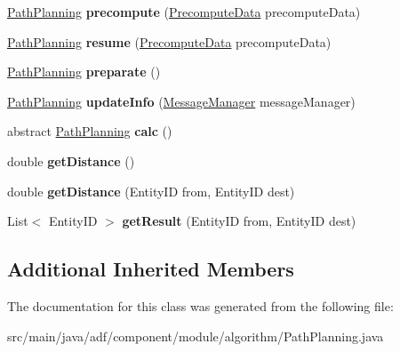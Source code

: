 \begin{DoxyCompactItemize}
\hyperlink{classadf_1_1component_1_1module_1_1algorithm_1_1PathPlanning}{Path\+Planning} {\bfseries precompute} (\hyperlink{classadf_1_1agent_1_1precompute_1_1PrecomputeData}{Precompute\+Data} precompute\+Data)
\item 
\hypertarget{classadf_1_1component_1_1module_1_1algorithm_1_1PathPlanning_a0102328d97aa36805913402296f4db8a}{}\label{classadf_1_1component_1_1module_1_1algorithm_1_1PathPlanning_a0102328d97aa36805913402296f4db8a} 
\hyperlink{classadf_1_1component_1_1module_1_1algorithm_1_1PathPlanning}{Path\+Planning} {\bfseries resume} (\hyperlink{classadf_1_1agent_1_1precompute_1_1PrecomputeData}{Precompute\+Data} precompute\+Data)
\item 
\hypertarget{classadf_1_1component_1_1module_1_1algorithm_1_1PathPlanning_a743d695590022ce81f825d7d08c9f0ea}{}\label{classadf_1_1component_1_1module_1_1algorithm_1_1PathPlanning_a743d695590022ce81f825d7d08c9f0ea} 
\hyperlink{classadf_1_1component_1_1module_1_1algorithm_1_1PathPlanning}{Path\+Planning} {\bfseries preparate} ()
\item 
\hypertarget{classadf_1_1component_1_1module_1_1algorithm_1_1PathPlanning_ac655c99277aa2079c3afe3db65b03042}{}\label{classadf_1_1component_1_1module_1_1algorithm_1_1PathPlanning_ac655c99277aa2079c3afe3db65b03042} 
\hyperlink{classadf_1_1component_1_1module_1_1algorithm_1_1PathPlanning}{Path\+Planning} {\bfseries update\+Info} (\hyperlink{classadf_1_1agent_1_1communication_1_1MessageManager}{Message\+Manager} message\+Manager)
\item 
\hypertarget{classadf_1_1component_1_1module_1_1algorithm_1_1PathPlanning_ae3ab0f57c70ca6d4517a8941bbcba3b4}{}\label{classadf_1_1component_1_1module_1_1algorithm_1_1PathPlanning_ae3ab0f57c70ca6d4517a8941bbcba3b4} 
abstract \hyperlink{classadf_1_1component_1_1module_1_1algorithm_1_1PathPlanning}{Path\+Planning} {\bfseries calc} ()
\item 
\hypertarget{classadf_1_1component_1_1module_1_1algorithm_1_1PathPlanning_a7ee5ef884fcde62b8403ffca4c615dcd}{}\label{classadf_1_1component_1_1module_1_1algorithm_1_1PathPlanning_a7ee5ef884fcde62b8403ffca4c615dcd} 
double {\bfseries get\+Distance} ()
\item 
\hypertarget{classadf_1_1component_1_1module_1_1algorithm_1_1PathPlanning_ab7eb7f771e77944831cc85dd7e3646ad}{}\label{classadf_1_1component_1_1module_1_1algorithm_1_1PathPlanning_ab7eb7f771e77944831cc85dd7e3646ad} 
double {\bfseries get\+Distance} (Entity\+ID from, Entity\+ID dest)
\item 
\hypertarget{classadf_1_1component_1_1module_1_1algorithm_1_1PathPlanning_a57bc80f3f2c042cf1a2b4a67781693c1}{}\label{classadf_1_1component_1_1module_1_1algorithm_1_1PathPlanning_a57bc80f3f2c042cf1a2b4a67781693c1} 
List$<$ Entity\+ID $>$ {\bfseries get\+Result} (Entity\+ID from, Entity\+ID dest)
\end{DoxyCompactItemize}
\subsection*{Additional Inherited Members}


The documentation for this class was generated from the following file\+:\begin{DoxyCompactItemize}
\item 
src/main/java/adf/component/module/algorithm/Path\+Planning.\+java\end{DoxyCompactItemize}
